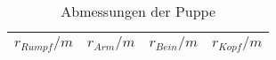 \begin{table}[h!]
  \centering
  \caption{Abmessungen der Puppe}
  \label{tab:radienpuppe}
  \begin{tabular}{c c c c}
    \toprule
     $r_{Rumpf}/m  $ & $r_{Arm}/m  $ & $r_{Bein}/m  $ & $r_{Kopf}/m  $\\
    \midrule
      
    \bottomrule
  \end{tabular}
\end{table}
